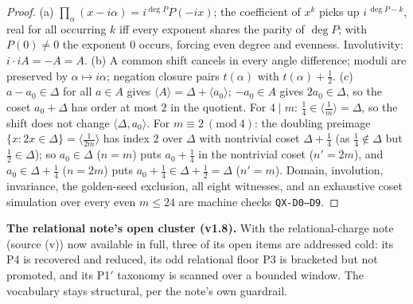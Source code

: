 \documentclass[11pt]{article}
\newcommand{\hx}[1]{\textcolor{cC}{\footnotesize\texttt{#1}}}
\theoremstyle{plain}
\theoremstyle{definition}
\theoremstyle{remark}
\begin{document}
\begin{proof}
(a) $\prod_\alpha(x-i\alpha)=i^{\deg P}P(-ix)$; the coefficient of $x^k$
picks up $i^{\,\deg P-k}$, real for all occurring $k$ iff every exponent
shares the parity of $\deg P$; with $P(0)\ne0$ the exponent $0$ occurs,
forcing even degree and evenness. Involutivity: $i\cdot iA=-A=A$. (b) A
common shift cancels in every angle difference; moduli are preserved by
$\alpha\mapsto i\alpha$; negation closure pairs $t(\alpha)$ with
$t(\alpha)+\tfrac12$. (c) $a-a_0\in\Delta$ for all $a\in A$ gives
$\langle A\rangle=\Delta+\langle a_0\rangle$; $-a_0\in A$ gives
$2a_0\in\Delta$, so the coset $a_0+\Delta$ has order at most $2$ in the
quotient. For $4\mid m$: $\tfrac14\in\langle\tfrac1m\rangle=\Delta$, so
the shift does not change $\langle\Delta,a_0\rangle$. For
$m\equiv2\ (\mathrm{mod}\ 4)$: the doubling preimage
$\{x:2x\in\Delta\}=\langle\tfrac1{2m}\rangle$ has index $2$ over $\Delta$
with nontrivial coset $\Delta+\tfrac14$ (as $\tfrac14\notin\Delta$ but
$\tfrac12\in\Delta$); so $a_0\in\Delta$ ($n=m$) puts $a_0+\tfrac14$ in the
nontrivial coset ($n'=2m$), and $a_0\in\Delta+\tfrac14$ ($n=2m$) puts
$a_0+\tfrac14\in\Delta+\tfrac12=\Delta$ ($n'=m$). Domain, involution,
invariance, the golden-seed exclusion, all eight witnesses, and an
exhaustive coset simulation over every even $m\le24$ are machine checks
\hx{QX-D0--D9}.
\end{proof}

\smallskip\noindent
\textbf{The relational note's open cluster (v1.8).} With the
relational-charge note (source (v)) now available in full, three of its open
items are addressed cold: its P4 is recovered and reduced, its odd relational
floor P3 is bracketed but not promoted, and its P1$'$ taxonomy is scanned over
a bounded window. The vocabulary stays structural, per the note's own
guardrail.
\end{document}
